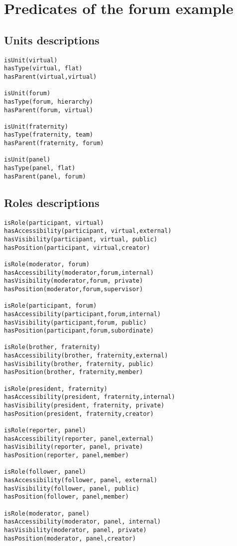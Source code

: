 \section{Predicates of the forum example} \label{sec:forumpredicates}
\subsection*{Units descriptions}
\begin{verbatim}
isUnit(virtual)
hasType(virtual, flat)
hasParent(virtual,virtual)

isUnit(forum)
hasType(forum, hierarchy)
hasParent(forum, virtual)

isUnit(fraternity)
hasType(fraternity, team)
hasParent(fraternity, forum)

isUnit(panel)
hasType(panel, flat)
hasParent(panel, forum)
\end{verbatim}


\subsection*{Roles descriptions}
\begin{verbatim}
isRole(participant, virtual)
hasAccessibility(participant, virtual,external)
hasVisibility(participant, virtual, public)
hasPosition(participant, virtual,creator)

isRole(moderator, forum)
hasAccessibility(moderator,forum,internal)
hasVisibility(moderator,forum, private)
hasPosition(moderator,forum,supervisor)

isRole(participant, forum)
hasAccessibility(participant,forum,internal)
hasVisibility(participant,forum, public)
hasPosition(participant,forum,subordinate)

isRole(brother, fraternity)
hasAccessibility(brother, fraternity,external)
hasVisibility(brother, fraternity, public)
hasPosition(brother, fraternity,member)

isRole(president, fraternity)
hasAccessibility(president, fraternity,internal)
hasVisibility(president, fraternity, private)
hasPosition(president, fraternity,creator)

isRole(reporter, panel)
hasAccessibility(reporter, panel,external)
hasVisibility(reporter, panel, private)
hasPosition(reporter, panel,member)

isRole(follower, panel)
hasAccessibility(follower, panel, external)
hasVisibility(follower, panel, public)
hasPosition(follower, panel,member)

isRole(moderator, panel)
hasAccessibility(moderator, panel, internal)
hasVisibility(moderator, panel, private)
hasPosition(moderator, panel,creator)
\end{verbatim}

